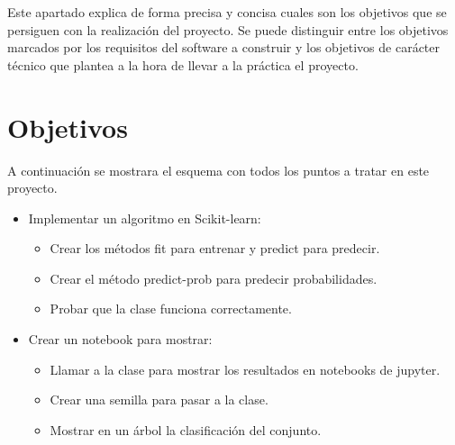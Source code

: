 
Este apartado explica de forma precisa y concisa cuales son los objetivos que se persiguen con la realización del proyecto. Se puede distinguir entre los objetivos marcados por los requisitos del software a construir y los objetivos de carácter técnico que plantea a la hora de llevar a la práctica el proyecto.

\section{Objetivos}
A continuación se mostrara el esquema con todos los puntos a tratar en este proyecto.
\begin{itemize}
\item Implementar un algoritmo en Scikit-learn:
	\begin{itemize}
		\item Crear los métodos fit para entrenar y predict para predecir.
		\item Crear el método predict-prob para predecir probabilidades.
		\item Probar que la clase funciona correctamente.
	\end{itemize}
\item Crear un notebook para mostrar:
	\begin{itemize}
		\item Llamar a la clase para mostrar los resultados en notebooks de jupyter.
		\item Crear una semilla para pasar a la clase.
		\item Mostrar en un árbol la clasificación del conjunto.
	\end{itemize}
\end{itemize}
